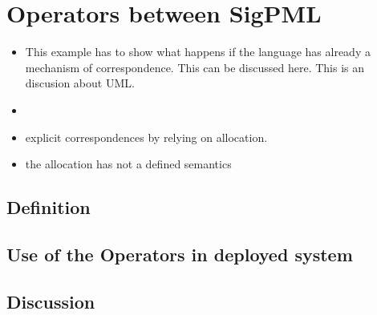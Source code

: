 \section{Operators between SigPML}

\begin{itemize}
	\item This example has to show what happens if the language has already a mechanism of correspondence. This can be discussed here. This is an discusion about UML.  
	\item {}
	\item explicit correspondences by relying on allocation.
	\item the allocation has not a defined semantics
\end{itemize}
\subsection{Definition}

\subsection{Use of the Operators in deployed system}

\subsection{Discussion}